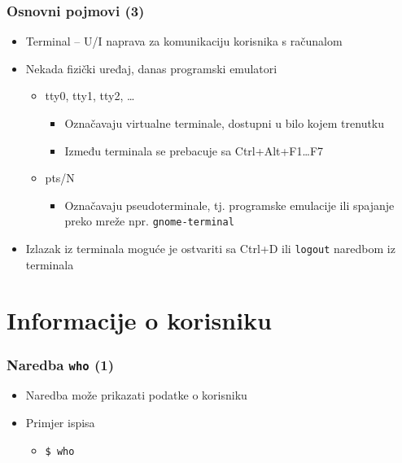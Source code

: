 \documentclass[table,usenames,dvipsnames] {beamer}
\newcommand{\shell}[1]{\texttt{#1}}
\begin{document}
\begin{frame}[t]
\frametitle{Osnovni pojmovi (3)}
\begin{itemize}
  \item Terminal -- U/I naprava za komunikaciju korisnika s računalom
  \item Nekada fizički uređaj, danas programski emulatori
  \begin{itemize}
    \item tty0, tty1, tty2, \ldots
    \begin{itemize}
      \item Označavaju virtualne terminale, dostupni u bilo kojem trenutku
	  \item Između terminala se prebacuje sa Ctrl+Alt+F1\ldots F7
    \end{itemize}
    \item pts/N
    \begin{itemize}
      \item Označavaju pseudoterminale, tj. programske emulacije ili 
                spajanje preko mreže npr. \shell{gnome-terminal}
    \end{itemize}
  \end{itemize}
  \item Izlazak iz terminala moguće je ostvariti sa Ctrl+D ili \shell{logout} naredbom iz terminala
\end{itemize}
\end{frame}


\section{Informacije o korisniku}
\begin{frame}[t]
\frametitle{Naredba \shell{who} (1)}
\begin{itemize}
  \item Naredba može prikazati podatke o korisniku
  \item Primjer ispisa
  \begin{itemize}
    \item[] \shell{\$ who}
    \begin{table}[h]
    \end{table}
  \end{itemize}
\end{itemize}
\end{frame}
\end{document}
